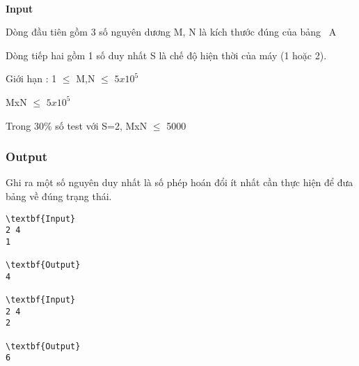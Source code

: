 \\\textbf{Input }\textbf{}

Dòng đầu tiên gồm 3 số nguyên dương M, N là kích thước đúng của bảng  A

Dòng tiếp hai gồm 1 số duy nhất S là chế độ hiện thời của máy (1 hoặc 2).

Giới hạn : 1  $\le$  M,N  $\le$  $5x10^{5}$

MxN  $\le$  $5x10^{5}$

Trong 30\% số test với S=2, MxN  $\le$  5000

\subsubsection{Output}

Ghi ra một số nguyên duy nhất là số phép hoán đổi ít nhất cần thực hiện để đưa bảng về đúng trạng thái.
\begin{verbatim}
\textbf{Input}
2 4
1

\textbf{Output}
4

\textbf{Input}
2 4
2

\textbf{Output}
6\end{verbatim}
